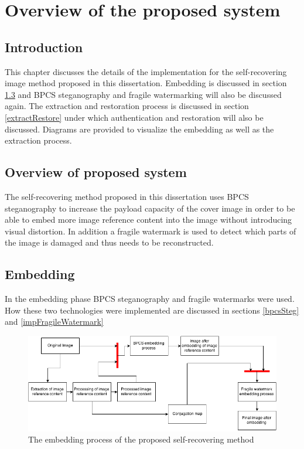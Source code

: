 \documentclass[12pt]{article}
\begin{document}
\section{Overview of the proposed system}
\label{Implementation}
\subsection{Introduction}
This chapter discusses the details of the implementation for the self-recovering image method proposed in this dissertation. Embedding is discussed in section \ref{embedding} and BPCS steganography and fragile watermarking will also be discussed again.
The extraction and restoration process is discussed in section \ref{extractRestore} under which authentication and restoration will also be discussed.
Diagrams are provided to visualize the embedding as well as the extraction process.

\subsection{Overview of proposed system}
\label{impOverview}
The self-recovering method proposed in this dissertation uses BPCS steganography to increase the payload capacity of the cover image in order to be able to embed more image reference content into the image without introducing visual distortion.
In addition a fragile watermark is used to detect which parts of the image is damaged and thus needs to be reconstructed.

\subsection{Embedding}
\label{embedding}
In the embedding phase BPCS steganography and fragile watermarks were used.  How these two technologies were implemented are discussed in sections \ref{bpcsSteg} and \ref{impFragileWatermark}

\begin{figure}[h]
\centerline{%
\includegraphics[scale=0.6]{"EmbeddingProcess"}%
} %
\caption{The embedding process of the proposed self-recovering method}
\label{fig:embeddingProcess}
\end{figure}
\end{document}
